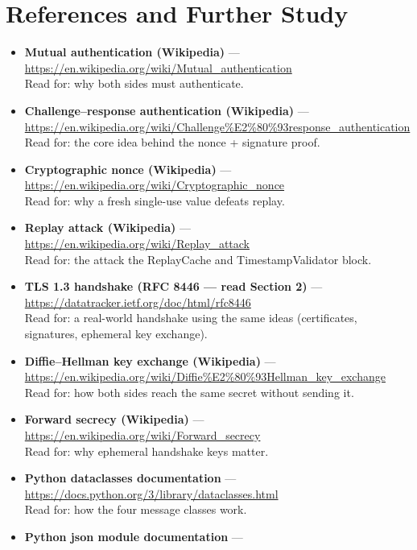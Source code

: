 \documentclass[11pt,a4paper]{article}
\begin{document}
\section{References and Further Study}
\begin{itemize}
  \item \textbf{Mutual authentication (Wikipedia)} ---
        \url{https://en.wikipedia.org/wiki/Mutual_authentication}\\
        Read for: why both sides must authenticate.
  \item \textbf{Challenge--response authentication (Wikipedia)} ---
        \url{https://en.wikipedia.org/wiki/Challenge%E2%80%93response_authentication}\\
        Read for: the core idea behind the nonce + signature proof.
  \item \textbf{Cryptographic nonce (Wikipedia)} ---
        \url{https://en.wikipedia.org/wiki/Cryptographic_nonce}\\
        Read for: why a fresh single-use value defeats replay.
  \item \textbf{Replay attack (Wikipedia)} ---
        \url{https://en.wikipedia.org/wiki/Replay_attack}\\
        Read for: the attack the ReplayCache and TimestampValidator block.
  \item \textbf{TLS 1.3 handshake (RFC 8446 --- read Section 2)} ---
        \url{https://datatracker.ietf.org/doc/html/rfc8446}\\
        Read for: a real-world handshake using the same ideas (certificates,
        signatures, ephemeral key exchange).
  \item \textbf{Diffie--Hellman key exchange (Wikipedia)} ---
        \url{https://en.wikipedia.org/wiki/Diffie%E2%80%93Hellman_key_exchange}\\
        Read for: how both sides reach the same secret without sending it.
  \item \textbf{Forward secrecy (Wikipedia)} ---
        \url{https://en.wikipedia.org/wiki/Forward_secrecy}\\
        Read for: why ephemeral handshake keys matter.
  \item \textbf{Python dataclasses documentation} ---
        \url{https://docs.python.org/3/library/dataclasses.html}\\
        Read for: how the four message classes work.
  \item \textbf{Python json module documentation} ---

\end{itemize}
\end{document}
